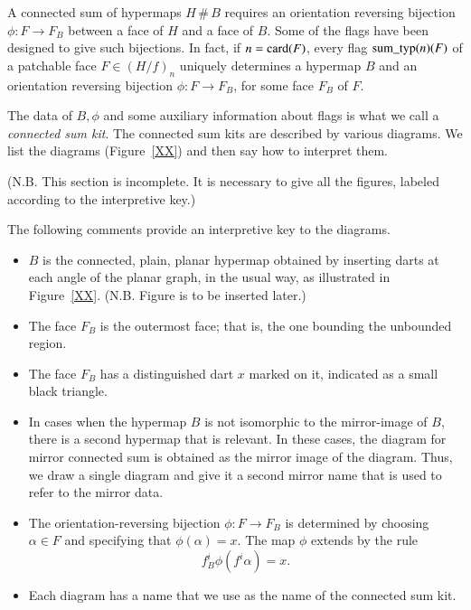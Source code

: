 A connected sum of hypermaps $H\,\#\,B$  requires an
orientation reversing bijection $\phi:F\to F_B$ between a face of
$H$ and a face of $B$.  Some of the flags have been designed to
give such bijections.  In fact,  if $n={\operatorname{card}}(F)$, every flag
${\operatorname{sum\_typ}}(n)(F)$ of a patchable face $F\in (H/f)_{n}$
uniquely determines a hypermap $B$ and an orientation reversing
bijection $\phi:F\to F_B$, for some face $F_B$ of $F$.

The data of $B,\phi$ and some auxiliary information about flags is
what we call a {\it connected sum kit}.  The connected sum kits are described by
various diagrams.  We list the diagrams (Figure~\ref{XX}) and then
say how to interpret them.

(N.B. This section is incomplete.  It is necessary to give all the
figures, labeled according to the interpretive key.)  %

The following comments provide an interpretive key to the
diagrams.
\begin{itemize}
    \item $B$ is the connected, plain, planar
    hypermap obtained by inserting darts at each angle of the
    planar graph, in the usual way, as illustrated in
    Figure~\ref{XX}. %
    (N.B. Figure is to be inserted later.) %
    \item The face $F_B$ is the outermost face; that is, the one
    bounding the unbounded region.
    \item The face $F_B$ has a distinguished dart $x$ marked on it,
    indicated as a small black triangle.
    \item In cases when the hypermap $B$ is not isomorphic to the
    mirror-image of $B$, there is a second hypermap that is
    relevant. In these cases, the diagram for mirror 
    connected sum is obtained as the
    mirror image of the diagram.  Thus, we draw a single diagram
    and give it a second mirror name that is used to refer to the
    mirror data.
    \item The orientation-reversing bijection $\phi:F\to F_B$ is
    determined by choosing $\alpha\in F$ and specifying that
    $\phi(\alpha) =x$.  The map $\phi$ extends by the rule
        $$f_B^i\phi(f^i\alpha ) = x.$$
    \item Each diagram has a name that we use as the name of the connected sum kit.
\end{itemize}

